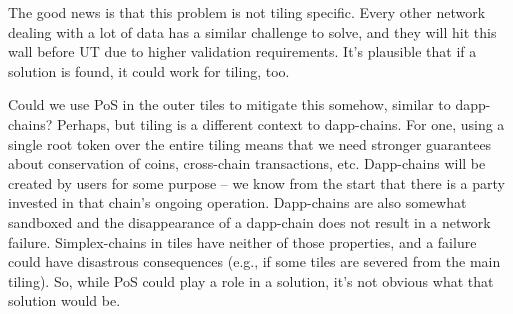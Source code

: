 The good news is that this problem is not tiling specific.
Every other network dealing with a lot of data has a similar challenge to solve, and they will hit this wall before UT due to higher validation requirements.
It's plausible that if a solution is found, it could work for tiling, too.

Could we use PoS in the outer tiles to mitigate this somehow, similar to dapp-chains?
Perhaps, but tiling is a different context to dapp-chains.
For one, using a single root token over the entire tiling means that we need stronger guarantees about conservation of coins, cross-chain transactions, etc.
Dapp-chains will be created by users for some purpose -- we know from the start that there is a party invested in that chain's ongoing operation.
Dapp-chains are also somewhat sandboxed and the disappearance of a dapp-chain does not result in a network failure.
Simplex-chains in tiles have neither of those properties, and a failure could have disastrous consequences (e.g., if some tiles are severed from the main tiling).
So, while PoS could play a role in a solution, it's not obvious what that solution would be.







